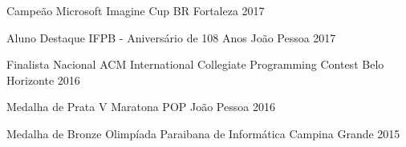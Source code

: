 \begin{cvhonors}

  \cvhonor
    {Campeão}
    {Microsoft Imagine Cup BR}
    {Fortaleza}
    {2017} %

  \cvhonor
    {Aluno Destaque}
    {IFPB - Aniversário de 108 Anos}
    {João Pessoa}
    {2017} %
%

  \cvhonor
    {Finalista Nacional}
    {ACM International Collegiate Programming Contest}
    {Belo Horizonte}
    {2016} %
%

  \cvhonor
    {Medalha de Prata}
    {V Maratona POP}
    {João Pessoa}
    {2016} %
%
%
%
%

  \cvhonor
    {Medalha de Bronze}
    {Olimpíada Paraibana de Informática}
    {Campina Grande}
    {2015} %
%
%
%
%
\end{cvhonors}
